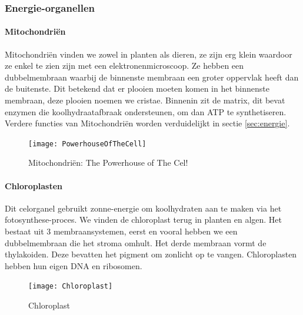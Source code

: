 \documentclass[a4paper,kul]{kulakarticle} %
\begin{document}
\subsubsection{Energie-organellen}
\paragraph{Mitochondriën}
Mitochondriën vinden we zowel in planten als dieren, ze zijn erg klein waardoor ze enkel te zien zijn met een elektronenmicroscoop. Ze hebben een dubbelmembraan waarbij de binnenste membraan een groter oppervlak heeft dan de buitenste. Dit betekend dat er plooien moeten komen in het binnenste membraan, deze plooien noemen we cristae. Binnenin zit de matrix, dit bevat enzymen die koolhydraatafbraak ondersteunen, om dan ATP te synthetiseren. Verdere functies van Mitochondriën worden verduidelijkt in sectie \ref{sec:energie}.
\begin{figure}[h!]
	\centering
	\texttt{[image: PowerhouseOfTheCell]}
	\caption[Mitochondria]{Mitochondriën: The Powerhouse of The Cel!}
	\label{fig:powerhouseofthecell}
\end{figure}
\paragraph{Chloroplasten}
Dit celorganel gebruikt zonne-energie om koolhydraten aan te maken via het fotosynthese-proces. We vinden de chloroplast terug in planten en algen. Het bestaat uit 3 membraansystemen, eerst en vooral hebben we een dubbelmembraan die het stroma omhult. Het derde membraan vormt de thylakoiden. Deze bevatten het pigment om zonlicht op te vangen. Chloroplasten hebben hun eigen DNA en ribosomen.  
\begin{figure}[h]
	\centering
	\texttt{[image: Chloroplast]}
	\caption[Chloroplast]{Chloroplast}
	\label{fig:chloroplast}
\end{figure}
\newpage
\end{document}
